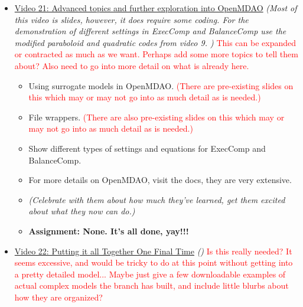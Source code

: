 \documentclass[12pt, letterpaper]{article}
\begin{document}
\begin{itemize}
	\item \underline{Video 21: Advanced topics and further exploration into OpenMDAO} \textit{(Most of this video is slides, however, it does require some coding. For the demonstration of different settings in ExecComp and BalanceComp use the modified paraboloid and quadratic codes from video 9. )} \textcolor{red}{This can be expanded or contracted as much as we want. Perhaps add some more topics to tell them about? Also need to go into more detail on what is already here.}
		\begin{itemize}
			\item Using surrogate models in OpenMDAO. \textcolor{red}{(There are pre-existing slides on this which may or may not go into as much detail as is needed.)}
			\item File wrappers. \textcolor{red}{(There are also pre-existing slides on this which may or may not go into as much detail as is needed.)}
			\item Show different types of settings and equations for ExecComp and BalanceComp.
			\item For more details on OpenMDAO, visit the docs, they are very extensive.
			\item \textit{(Celebrate with them about how much they’ve learned, get them excited about what they now can do.)}
			\item \textbf{Assignment: None. It's all done, yay!!!}
		\end{itemize}
		
	\item \underline{Video 22: Putting it all Together One Final Time} \textit{()} \textcolor{red}{Is this really needed? It seems excessive, and would be tricky to do at this point without getting into a pretty detailed model... Maybe just give a few downloadable examples of actual complex models the branch has built, and include little blurbs about how they are organized?}

\end{itemize}
\end{document}
